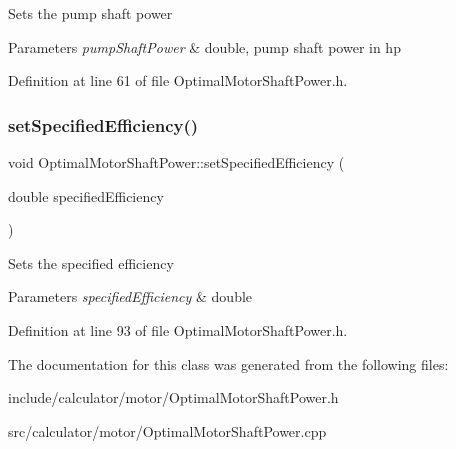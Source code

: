 Sets the pump shaft power 
\begin{DoxyParams}{Parameters}
{\em pump\+Shaft\+Power} & double, pump shaft power in hp \\
\hline
\end{DoxyParams}


Definition at line 61 of file Optimal\+Motor\+Shaft\+Power.\+h.

\mbox{\label{class_optimal_motor_shaft_power_a92f7da022e380abbd8cfd308e8aa5e58}} 
\subsubsection{\texorpdfstring{set\+Specified\+Efficiency()}{setSpecifiedEfficiency()}}
{\footnotesize\ttfamily void Optimal\+Motor\+Shaft\+Power\+::set\+Specified\+Efficiency (\begin{DoxyParamCaption}\item[{double}]{specified\+Efficiency }\end{DoxyParamCaption})\hspace{0.3cm}{\ttfamily [inline]}}

Sets the specified efficiency 
\begin{DoxyParams}{Parameters}
{\em specified\+Efficiency} & double \\
\hline
\end{DoxyParams}


Definition at line 93 of file Optimal\+Motor\+Shaft\+Power.\+h.



The documentation for this class was generated from the following files\+:\begin{DoxyCompactItemize}
\item 
include/calculator/motor/Optimal\+Motor\+Shaft\+Power.\+h\item 
src/calculator/motor/Optimal\+Motor\+Shaft\+Power.\+cpp\end{DoxyCompactItemize}
